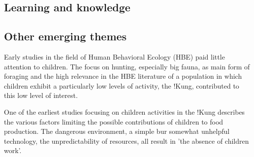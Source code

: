 \subsection{Learning and knowledge}

\subsection{Other emerging themes}



Early studies in the field of Human Behavioral Ecology (HBE) paid little attention to children. The focus on hunting, especially big fauna, as main form of foraging and the high relevance in the HBE literature of a population in which children exhibit a particularly low levels of activity, the !Kung, contributed to this low level of interest. 

One of the earliest studies focusing on children activities in the !Kung \cite{lee_social_1976} describes the various factors limiting the possible contributions of children to food production. The dangerous environment, a simple bur somewhat unhelpful technology, the unpredictability of resources, all result in 'the absence of children work'.
